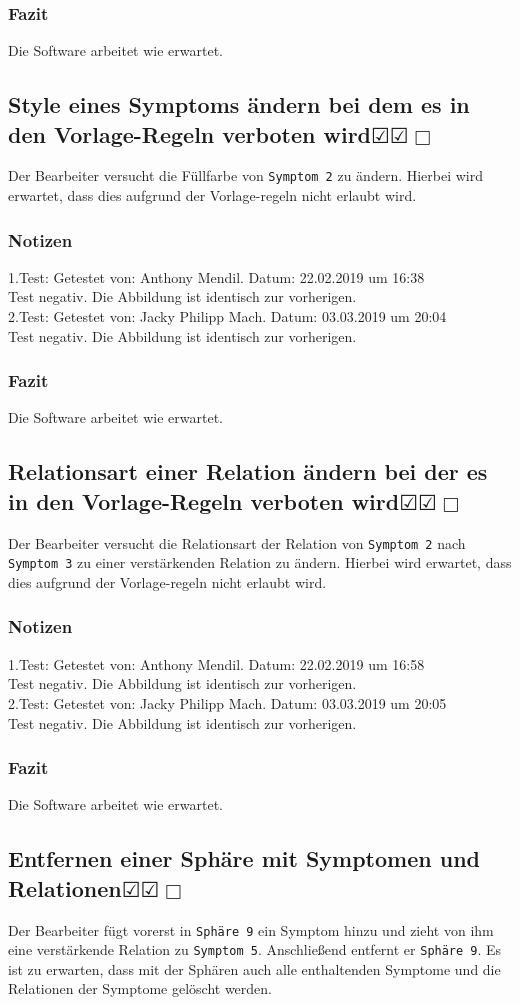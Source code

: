 \documentclass[enabledeprecatedfontcommands]{scrartcl}
\newcommand{\subsectiont}[2]{\subsection[#1]{#1{\normalsize\normalfont #2}}}
\newcommand{\leer}{$\Box$}
\newcommand{\ok}{$\CheckedBox$}
\begin{document}
\subsubsection{Fazit}
Die Software arbeitet wie erwartet.

\subsectiont{Style eines Symptoms ändern bei dem es in den Vorlage-Regeln verboten wird}{\dotfill\ok\ok\leer}
Der Bearbeiter versucht die Füllfarbe von \texttt{Symptom 2} zu ändern. Hierbei wird erwartet, dass dies aufgrund der Vorlage-regeln nicht erlaubt wird.
\subsubsection{Notizen}
1.Test: Getestet von: Anthony Mendil. Datum: 22.02.2019 um 16:38 \\
Test negativ. Die Abbildung ist identisch zur vorherigen.\\
2.Test: Getestet von: Jacky Philipp Mach. Datum: 03.03.2019 um 20:04 \\
Test negativ. Die Abbildung ist identisch zur vorherigen.
\subsubsection{Fazit}
Die Software arbeitet wie erwartet.

\subsectiont{Relationsart einer Relation ändern bei der es in den Vorlage-Regeln verboten wird}{\dotfill\ok\ok\leer}
Der Bearbeiter versucht die Relationsart der Relation von \texttt{Symptom 2} nach \texttt{Symptom 3} zu einer verstärkenden Relation zu ändern. Hierbei wird erwartet, dass dies aufgrund der Vorlage-regeln nicht erlaubt wird.
\subsubsection{Notizen}
1.Test: Getestet von: Anthony Mendil. Datum: 22.02.2019 um 16:58 \\
Test negativ. Die Abbildung ist identisch zur vorherigen.\\
2.Test: Getestet von: Jacky Philipp Mach. Datum: 03.03.2019 um 20:05 \\
Test negativ. Die Abbildung ist identisch zur vorherigen.
\subsubsection{Fazit}
Die Software arbeitet wie erwartet.

\subsectiont{Entfernen einer Sphäre mit Symptomen und Relationen}{\dotfill\ok\ok\leer}
Der Bearbeiter fügt vorerst in \texttt{Sphäre 9} ein Symptom hinzu und zieht von ihm eine verstärkende Relation zu \texttt{Symptom 5}. Anschließend entfernt er \texttt{Sphäre 9}. Es ist zu erwarten, dass mit der Sphären auch alle enthaltenden Symptome und die Relationen der Symptome gelöscht werden. 
\end{document}
